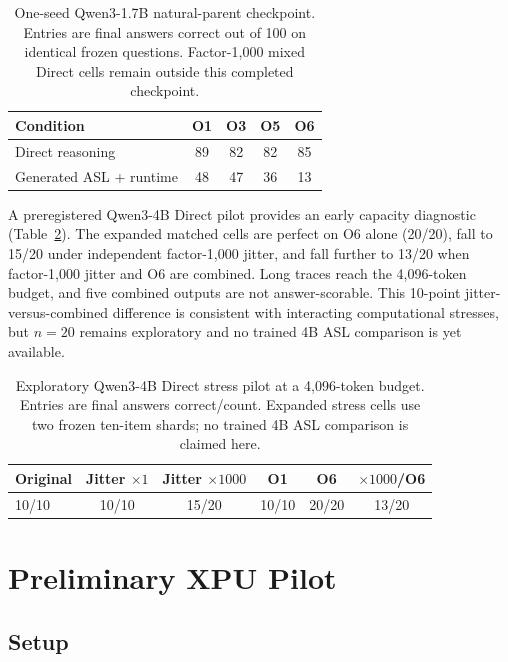 \documentclass[11pt]{article}
\begin{document}
\begin{table}[t]
\centering
\small
\caption{One-seed Qwen3-1.7B natural-parent checkpoint. Entries are final
answers correct out of 100 on identical frozen questions. Factor-1,000 mixed
Direct cells remain outside this completed checkpoint.}
\label{tab:natural-operator-capacity}
\begin{tabular}{@{}lcccc@{}}
\toprule
Condition & O1 & O3 & O5 & O6 \\
\midrule
Direct reasoning & 89 & 82 & 82 & 85 \\
Generated ASL + runtime & 48 & 47 & 36 & 13 \\
\bottomrule
\end{tabular}
\end{table}

A preregistered Qwen3-4B Direct pilot provides an early capacity diagnostic
(Table~\ref{tab:qwen4b-stress-pilot}). The expanded matched cells are perfect
on O6 alone (20/20), fall to 15/20 under independent factor-1,000 jitter, and
fall further to 13/20 when factor-1,000 jitter and O6 are combined. Long traces
reach the 4,096-token budget, and five combined outputs are not answer-scorable.
This 10-point jitter-versus-combined difference is consistent with interacting
computational stresses, but $n=20$ remains exploratory and no trained 4B ASL
comparison is yet available.

\begin{table}[t]
\centering
\small
\caption{Exploratory Qwen3-4B Direct stress pilot at a 4,096-token budget.
Entries are final answers correct/count. Expanded stress cells use two frozen
ten-item shards; no trained 4B ASL comparison is claimed here.}
\label{tab:qwen4b-stress-pilot}
\begin{tabular}{@{}lccccc@{}}
\toprule
Original & Jitter $\times1$ & Jitter $\times1000$ & O1 & O6 & $\times1000$/O6 \\
\midrule
10/10 & 10/10 & 15/20 & 10/10 & 20/20 & 13/20 \\
\bottomrule
\end{tabular}
\end{table}

\section{Preliminary XPU Pilot}

\subsection{Setup}
\end{document}
